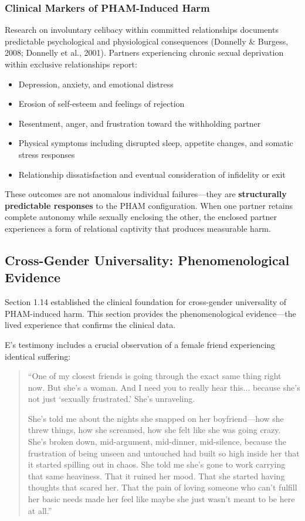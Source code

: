 \documentclass[12pt, letterpaper]{article}
\begin{document}
\subsubsection{Clinical Markers of PHAM-Induced Harm}

Research on involuntary celibacy within committed relationships documents predictable psychological and physiological consequences (Donnelly \& Burgess, 2008; Donnelly et al., 2001). Partners experiencing chronic sexual deprivation within exclusive relationships report:

\begin{itemize}
    \item Depression, anxiety, and emotional distress
    \item Erosion of self-esteem and feelings of rejection
    \item Resentment, anger, and frustration toward the withholding partner
    \item Physical symptoms including disrupted sleep, appetite changes, and somatic stress responses
    \item Relationship dissatisfaction and eventual consideration of infidelity or exit
\end{itemize}

These outcomes are not anomalous individual failures---they are \textbf{structurally predictable responses} to the PHAM configuration. When one partner retains complete autonomy while sexually enclosing the other, the enclosed partner experiences a form of relational captivity that produces measurable harm.

\subsection{Cross-Gender Universality: Phenomenological Evidence}

Section 1.14 established the clinical foundation for cross-gender universality of PHAM-induced harm. This section provides the phenomenological evidence---the lived experience that confirms the clinical data.

E's testimony includes a crucial observation of a female friend experiencing identical suffering:

\begin{quote}
``One of my closest friends is going through the exact same thing right now. But she's a woman. And I need you to really hear this... because she's not just `sexually frustrated.' She's unraveling.

She's told me about the nights she snapped on her boyfriend---how she threw things, how she screamed, how she felt like she was going crazy. She's broken down, mid-argument, mid-dinner, mid-silence, because the frustration of being unseen and untouched had built so high inside her that it started spilling out in chaos. She told me she's gone to work carrying that same heaviness. That it ruined her mood. That she started having thoughts that scared her. That the pain of loving someone who can't fulfill her basic needs made her feel like maybe she just wasn't meant to be here at all.''
\end{quote}
\end{document}
